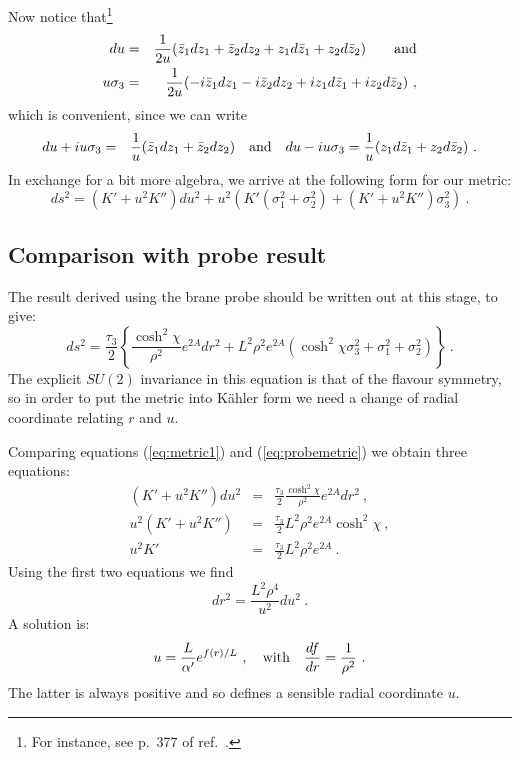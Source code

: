 \documentclass[a4paper,12pt]{article}
\newcommand{\labell}[1]{\label{#1}}
\begin{document}
Now notice that\footnote{For instance, see p.~377 of ref.~\cite{eguchi}.} 
\begin{eqnarray}
  du & = & \frac{1}{2u} 
(\bar{z}_1 dz_1 + \bar{z}_2 dz_2 + z_1 d\bar{z}_1 + z_2 d\bar{z}_2)\qquad
 {\rm and}\nonumber\\
u \sigma_3 & = & \frac{1}{2u} ( -i \bar{z}_1 dz_1 -i \bar{z}_2 dz_2 + i
 z_1 d\bar{z}_1 + i z_2 d\bar{z}_2)\ ,
\end{eqnarray}
which is convenient, since we can write
\begin{eqnarray}
  du + iu \sigma_3 & = & \frac{1}{u} (\bar{z}_1 dz_1 + \bar{z}_2 dz_2) \quad {\rm and}\quad
  du - iu \sigma_3  =  \frac{1}{u} (z_1 d\bar{z}_1 + z_2 d\bar{z}_2)\ .
\end{eqnarray}
In exchange for a bit more algebra, we arrive at the following form
for our metric:
\begin{equation}
  ds^2 = (K' + u^2 K'')du^2 + u^2(K'(\sigma_1^2 + \sigma_2^2) + (K' + u^2 K'') \sigma_3^2)\ .
  \labell{eq:metric1}
\end{equation}

\subsection{Comparison with probe result}
\label{sec:comparison1}
The result derived using the brane probe should be written out at this
stage, to give:
\begin{equation}
  ds^2 = \frac{\tau_3}{2} \left\{ \frac{\cosh^2 \chi}{\rho^2} e^{2A} dr^2 + L^2 \rho^2 e^{2A}(\cosh^2 \chi \sigma_3^2 + \sigma_1^2 + \sigma_2^2) \right\}\ .
  \labell{eq:probemetric}
\end{equation}
The explicit $SU(2)$ invariance in this equation is that of the
flavour symmetry, so in order to put the metric into K\"ahler form we
need a change of radial coordinate relating $r$ and $u$.

Comparing equations (\ref{eq:metric1}) and (\ref{eq:probemetric}) we
obtain three equations:
\begin{eqnarray}
  (K' + u^2 K'') du^2 & = & \frac{\tau_3}{2} \frac{\cosh^2 \chi}{\rho^2} e^{2A} dr^2\ ,
  \labell{eq:eq1} \\
  u^2 (K' + u^2 K'') & = & \frac{\tau_3}{2} L^2 \rho^2 e^{2A} \cosh^2 \chi\ ,
  \labell{eq:eq2} \\
  u^2 K' & = & \frac{\tau_3}{2} L^2 \rho^2 e^{2A} \ .
  \labell{eq:eq3}
\end{eqnarray}
%
Using the first two equations we find
\begin{equation}
   dr^2 = \frac{L^2 \rho^4}{u^2} du^2\ .
  \labell{eq:du1}
\end{equation}
%
A solution is:
\begin{equation}
  u = \frac{L}{\alpha'} e^{f(r)/L}\ ,\quad {\rm with} \quad
\frac{df}{dr}=\frac{1}{\rho^2}\ .
\labell{udef}
\end{equation}
%
The latter is always positive and so defines a sensible radial coordinate
$u$.  
\end{document}
